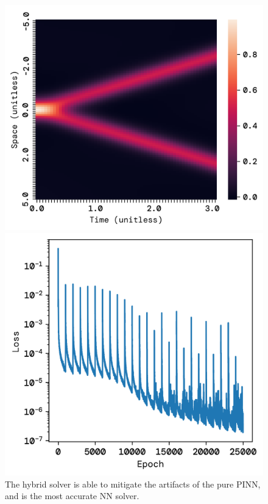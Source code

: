\documentclass[twoside,11pt]{report}
\begin{document}
    \begin{figure}[!ht]
        \begin{minipage}[t]{0.5\textwidth - 1mm}
            \begin{center}
                \includegraphics[width=\textwidth]{../runsAndFigures/wave_tf_hybrid.png}
            \end{center}
            \caption
            {
                The hybrid solver is able to mitigate the artifacts of the pure PINN, and is the most accurate NN solver.
            }\label{fig:wave_own_dnn}
        \end{minipage}
        \hspace{2mm}
        \begin{minipage}[t]{0.5\textwidth - 1mm}
            \begin{center}
                \includegraphics[width=\textwidth]{../runsAndFigures/wave_tf_hybrid_loss.png}

\end{center}
\end{minipage}
\end{figure}
\end{document}
